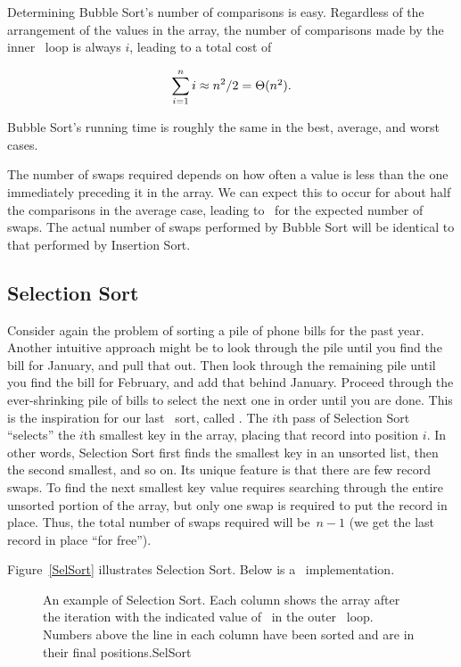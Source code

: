 Determining Bubble Sort's number of comparisons is easy.
Regardless of the arrangement of the values in the array, the number
of comparisons made by the inner \Cfor\ loop is always \(i\),
leading to a total cost of

\[\sum_{i=1}^n i \approx n^2/2 = \mbox{$\Theta(n^2)$}. \]

\noindent Bubble Sort's running time is roughly the same
in the best, average, and worst cases.

The number of swaps required depends on how often a
value is less than the one immediately preceding it in the array.
We can expect this to occur for about half the comparisons in the
average case, leading to \Thetantwo\ for the expected number
of swaps.
The actual number of swaps performed by Bubble Sort will be identical
to that performed by
Insertion Sort.

\subsection{Selection Sort}
\label{SelSortSec}

Consider again the problem of sorting a pile of phone bills for the
past year.
Another intuitive approach might be to look through the pile until you
find the bill for January, and pull that out.
Then look through the remaining pile until you find the bill for
February, and add that behind January.
Proceed through the ever-shrinking pile of bills to select the next
one in order until you are done.
This is the inspiration for
our last \Thetantwo\ sort, called .
The \(i\)th pass of Selection Sort ``selects'' the \(i\)th smallest
key in the array, placing that record into position \(i\).
In other words, Selection Sort first finds the smallest key in an
unsorted list, then the second smallest, and so on.
Its unique feature is that there are few record swaps.
To find the next smallest key value requires searching through
the entire unsorted portion of the array, but only one swap is
required to put the record in place.
Thus, the total number of swaps required will be~\(n-1\)
(we get the last record in place ``for free'').

Figure~\ref{SelSort} illustrates Selection Sort.
Below is a \Lang\ implementation.

\begin{figure}
\vspace{-\bigskipamount}
{An example of Selection Sort.
Each column shows the array after the iteration with the indicated
value of~ in the outer \Cfor\ loop.
Numbers above the line in each column have been sorted and are in
their final positions.}{SelSort}
\medskip
\end{figure}


